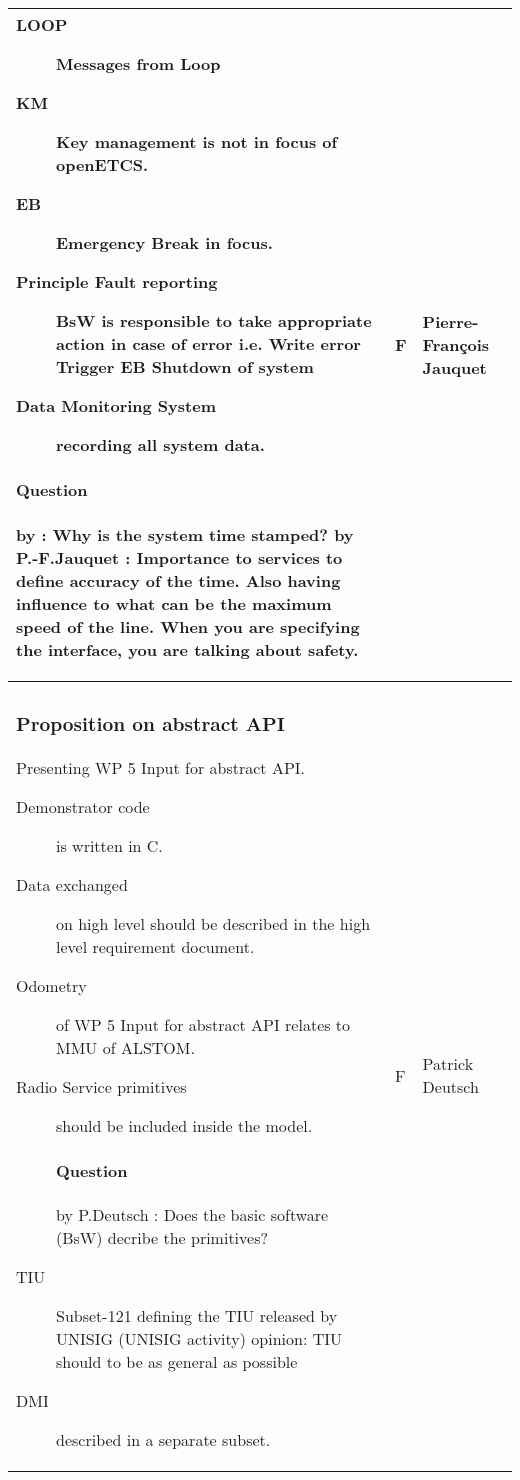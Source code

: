 \documentclass[a4paper]{article}
\newcommand{\Q}[2]{\paragraph{Question} 
	\ifthenelse{\isempty{#1}}%
    	{}%
    	{by #1}%
    : #2}
\newcommand{\A}[2]{\newline{\textbf{Answer}}
	\ifthenelse{\isempty{#1}}%
    	{}%
    	{by #1}%
    : #2}
\begin{document}
\begin{longtable}{|p{}|p{}|p{}|}
\begin{description}
	\item [LOOP] Messages from Loop
	\item [KM] Key management is not in focus of openETCS.
	\item [EB] Emergency Break in focus.
	\item [Principle Fault reporting] BsW is responsible to take appropriate action in case of error i.e.
		\subitem [-] Write error
		\subitem [-] Trigger EB
		\subitem [-] Shutdown of system
	\item [Data Monitoring System] recording all system data.
\end{description}

\Q{}{Why is the system time stamped?}
\A{P.-F.Jauquet}{Importance to services to define accuracy of the time. Also having influence to what can be the maximum speed of the line. When you are specifying the interface, you are talking about safety.}

& F
& Pierre-Fran\c{c}ois Jauquet
\\\hline

\subsubsection{Proposition on abstract API} %

Presenting WP 5 Input for abstract API.

\begin{description}
	\item [Demonstrator code] is written in C.
	\item [Data exchanged] on high level should be described in the high level requirement document.
	\item [Odometry] of WP 5 Input for abstract API relates to MMU of ALSTOM.
	\item [Radio Service primitives] should be included inside the model.
	\Q{P.Deutsch}{Does the basic software (BsW) decribe the primitives?}
	\item [TIU] Subset-121 defining the TIU released by UNISIG (UNISIG activity) 
	\newline opinion: TIU should to be as general as possible
	\item [DMI] described in a separate subset. 
\end{description}


& F
& Patrick Deutsch
\\\hline

\end{longtable}
\end{document}
